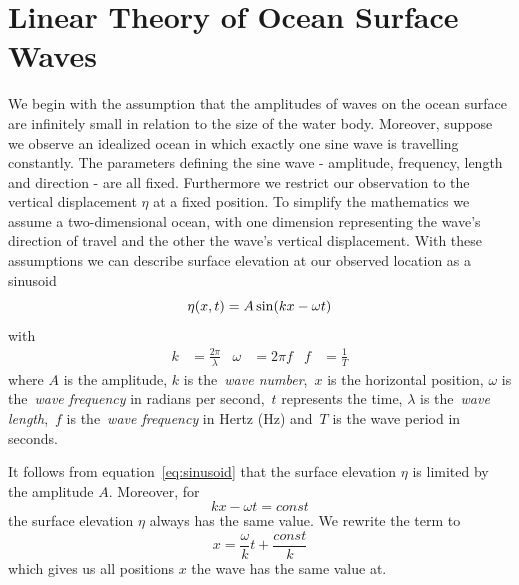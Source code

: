 \newcommand{\mvec}[1]{\mathbf{#1}}
\newcommand{\mvecx}[1]{\mathbf{#1}_x}
\newcommand{\mvecy}[1]{\mathbf{#1}_y}
\newcommand{\mvecz}[1]{\mathbf{#1}_z}
\newcommand{\mvecw}[1]{\mathbf{#1}_w}
\newcommand{\mmat}[1]{\mathbf{#1}}
\newcommand{\transpose}[1]{#1^{\mathsf{T}}}
\newcommand{\inverse}[1]{#1^{\mathsf{-1}}}
\newcommand{\normalise}[1]{\frac{#1}{\norm{#1}}}

\DeclarePairedDelimiter\abs{\lvert}{\rvert}
\DeclarePairedDelimiter\norm{\lVert}{\rVert}

\section{Linear Theory of Ocean Surface Waves}
\label{sec:linear_theory_ocean_waves}

We begin with the assumption that the amplitudes of waves on the ocean surface are infinitely
small in relation to the size of the water body. Moreover, suppose we observe an idealized ocean
in which exactly one sine wave is travelling constantly. The parameters defining the sine wave
- amplitude, frequency, length and direction - are all fixed. Furthermore we restrict our observation
to the vertical displacement $\eta$ at a fixed position. To simplify the mathematics we assume
a two-dimensional ocean, with one dimension representing the wave's direction of travel and the
 other the wave's vertical displacement. With these assumptions we can describe surface elevation
at our observed location as a sinusoid
%
\begin{equation}
\label{eq:sinusoid}
 \eta(x, t) = A\sin(kx - \omega t)\\
\end{equation}
with
\begin{align}
 k &= \frac{2\pi}{\lambda} & \omega &= 2\pi f & f &= \frac{1}{T}
\end{align}
%
where $A$ is the amplitude, $k$ is the~\emph{wave number},~$x$ is the horizontal position,
$\omega$ is the~\emph{wave frequency} in radians per second,~$t$ represents the time,
$\lambda$ is the~\emph{wave length},~$f$ is the~\emph{wave frequency} in Hertz (Hz) and~$T$
is the wave period in seconds.

It follows from equation~\ref{eq:sinusoid} that the surface elevation $\eta$ is limited by the amplitude $A$.
Moreover, for
\begin{equation}
kx - \omega t = const
\end{equation}
the surface elevation $\eta$ always has the same value. We rewrite the term to
\begin{equation}
x = \frac{\omega}{k}t + \frac{const}{k}
\end{equation}
which gives us all positions $x$ the wave has the same value at.
%

